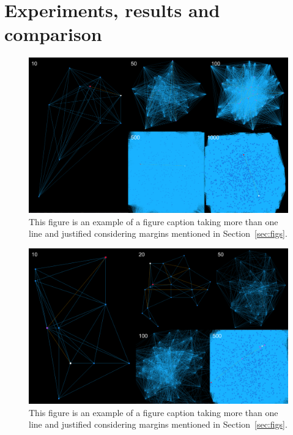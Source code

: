 \documentclass[12pt]{article}
\begin{document}
\section{Experiments, results and comparison}


\begin{figure}[ht]
\centering
\includegraphics[width=1.0\textwidth]{Template_SBC/template-latex/grafoc.png}
\caption{This figure is an example of a figure caption taking more than one
  line and justified considering margins mentioned in Section~\ref{sec:figs}.}
\label{fig:exampleFig2}
\end{figure}

\begin{figure}[ht]
\centering
\includegraphics[width=1.0\textwidth]{Template_SBC/template-latex/grafonc.png}
\caption{This figure is an example of a figure caption taking more than one
  line and justified considering margins mentioned in Section~\ref{sec:figs}.}
\label{fig:exampleFig2}
\end{figure}
\end{document}
